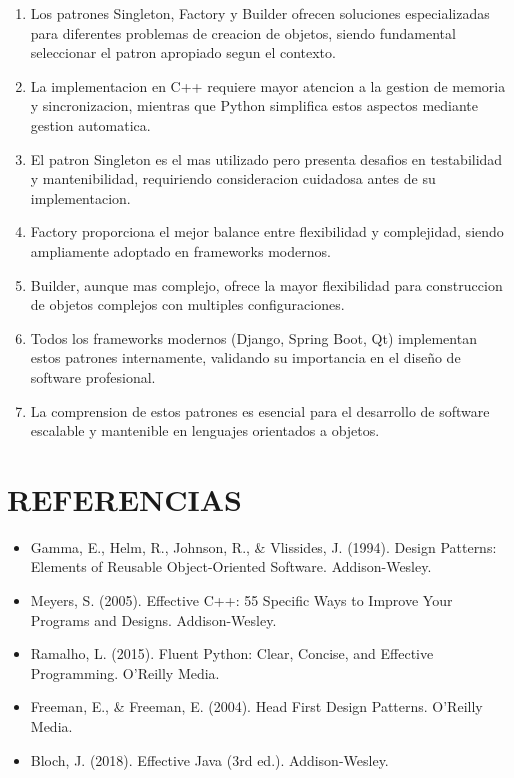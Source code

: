 \documentclass[11pt,a4paper]{article}
\begin{document}
\begin{enumerate}
    \item Los patrones Singleton, Factory y Builder ofrecen soluciones especializadas para diferentes problemas de creacion de objetos, siendo fundamental seleccionar el patron apropiado segun el contexto.
    
    \item La implementacion en C++ requiere mayor atencion a la gestion de memoria y sincronizacion, mientras que Python simplifica estos aspectos mediante gestion automatica.
    
    \item El patron Singleton es el mas utilizado pero presenta desafios en testabilidad y mantenibilidad, requiriendo consideracion cuidadosa antes de su implementacion.
    
    \item Factory proporciona el mejor balance entre flexibilidad y complejidad, siendo ampliamente adoptado en frameworks modernos.
    
    \item Builder, aunque mas complejo, ofrece la mayor flexibilidad para construccion de objetos complejos con multiples configuraciones.
    
    \item Todos los frameworks modernos (Django, Spring Boot, Qt) implementan estos patrones internamente, validando su importancia en el diseño de software profesional.
    
    \item La comprension de estos patrones es esencial para el desarrollo de software escalable y mantenible en lenguajes orientados a objetos.
\end{enumerate}

\section{REFERENCIAS}

\begin{itemize}
    \item Gamma, E., Helm, R., Johnson, R., \& Vlissides, J. (1994). Design Patterns: Elements of Reusable Object-Oriented Software. Addison-Wesley.
    
    \item Meyers, S. (2005). Effective C++: 55 Specific Ways to Improve Your Programs and Designs. Addison-Wesley.
    
    \item Ramalho, L. (2015). Fluent Python: Clear, Concise, and Effective Programming. O'Reilly Media.
    
    \item Freeman, E., \& Freeman, E. (2004). Head First Design Patterns. O'Reilly Media.
    
    \item Bloch, J. (2018). Effective Java (3rd ed.). Addison-Wesley.
\end{itemize}
\end{document}
